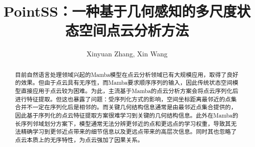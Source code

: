 \documentclass[preprint,12pt]{elsarticle}
\begin{document}
\begin{frontmatter}



\title{PointSS：一种基于几何感知的多尺度状态空间点云分析方法}


\author{Xinyuan Zhang, Xin Wang} %


\begin{abstract}

目前自然语言处理领域兴起的Mamba模型在点云分析领域已有大规模应用，取得了良好的效果。但由于点云具有无序性，而Mamba要求顺序序列的输入，因此传统状态空间模型直接应用于点云较为困难。为此，主流基于Mamba的点云分析方案会将点云序列化后进行特征提取。但这也暴露了问题：受序列化方式的影响，空间坐标距离最邻近的点集合并不一定在序列化后是相邻的。而关键几何结构信息通常是由最邻近点集合提供的，因此基于序列化的点云特征提取方案很难学习到关键的几何结构信息。此外在Mamba的长序列邻域划分方案下，模型通常无法分辨更邻近的点和更远点的学习权重，导致其无法精确学习到更邻近点带来的细节信息以及更远点带来的高层次信息。同时其也忽略了点云本质上的无序特性，为点云强加了因果关系。


\end{abstract}
\end{frontmatter}
\end{document}
